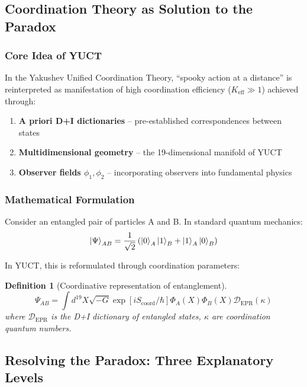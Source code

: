 \documentclass[11pt,a4paper]{article}
\newtheorem{definition}{Definition}
\begin{document}
	\subsection{Coordination Theory as Solution to the Paradox}
	\label{subsec:yuct-solution}
	
	\subsubsection{Core Idea of YUCT}
	In the Yakushev Unified Coordination Theory, ``spooky action at a distance'' is reinterpreted as manifestation of high coordination efficiency ($K_{\mathrm{eff}} \gg 1$) achieved through:
	
	\begin{enumerate}
		\item \textbf{A priori D+I dictionaries} -- pre-established correspondences between states
		\item \textbf{Multidimensional geometry} -- the 19-dimensional manifold of YUCT
		\item \textbf{Observer fields $\phi_1, \phi_2$} -- incorporating observers into fundamental physics
	\end{enumerate}
	
	\subsubsection{Mathematical Formulation}
	Consider an entangled pair of particles A and B. In standard quantum mechanics:
	\begin{equation}
		\ket{\Psi}_{AB} = \frac{1}{\sqrt{2}} \left( \ket{0}_A \ket{1}_B + \ket{1}_A \ket{0}_B \right)
	\end{equation}
	
	In YUCT, this is reformulated through coordination parameters:
	
	\begin{definition}[Coordinative representation of entanglement]
		\begin{equation}
			\Psi_{AB} = \int d^{19}X \sqrt{-G} \exp\left[i S_{\text{coord}}/\hbar\right] \Phi_A(X) \Phi_B(X) \mathcal{D}_{\text{EPR}}(\kappa)
		\end{equation}
		where $\mathcal{D}_{\text{EPR}}$ is the D+I dictionary of entangled states, $\kappa$ are coordination quantum numbers.
	\end{definition}
	
	\subsection{Resolving the Paradox: Three Explanatory Levels}
	\label{subsec:three-levels}
	
\end{document}
